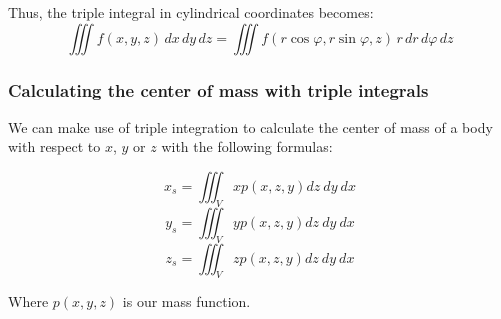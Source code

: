 Thus, the triple integral in cylindrical coordinates becomes:
\[
\iiint f(x, y, z)\, dx\, dy\, dz = \iiint f(r \cos \varphi, r \sin \varphi, z)\, r\, dr\, d\varphi\, dz
\]

\subsubsection{Calculating the center of mass with triple integrals}

We can make use of triple integration to calculate the center of mass of a body with
respect to \(x\), \(y\) or \(z\) with the following formulas:

\[x_s = \iiint_V xp(x,z,y)dz\ dy \ dx\]
\[y_s = \iiint_V yp(x,z,y)dz\ dy \ dx\]
\[z_s = \iiint_V zp(x,z,y)dz\ dy \ dx\]

Where \(p(x,y,z)\) is our mass function.
